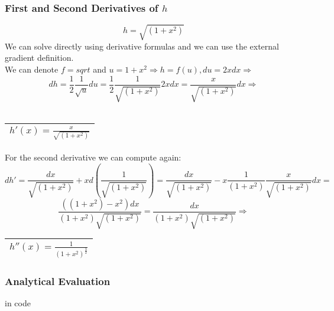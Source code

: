 \documentclass{article}
\newcommand{\rectres}[1]{
\begin{center}
\begin{tabular}{ |c| }
\hline
 #1\\
\hline
\end{tabular}
\end{center}
}
\begin{document}
\subsubsection{First and Second Derivatives of $h$}
$$h=\sqrt{(1+x^2)}$$
We can solve directly using derivative formulas and we can use the external gradient definition.\\
We can denote $f=sqrt$ and $u=1+x^2 \Rightarrow h=f(u), du=2xdx \Rightarrow$
$$dh=\frac{1}{2}\frac{1}{\sqrt{u}}du=\frac{1}{2}\frac{1}{\sqrt{(1+x^2)}}2xdx=\frac{x}{\sqrt{(1+x^2)}}dx\Rightarrow$$\\
\rectres{$h'(x)=\frac{x}{\sqrt{(1+x^2)}}$}
For the second derivative we can compute again:\\
$$dh'=\frac{dx}{\sqrt{(1+x^2)}}+xd(\frac{1}{\sqrt{(1+x^2)}})=\frac{dx}{\sqrt{(1+x^2)}}-x\frac{1}{(1+x^2)}\frac{x}{\sqrt{(1+x^2)}}dx=$$
$$\frac{((1+x^2)-x^2)dx}{(1+x^2)\sqrt{(1+x^2)}}=\frac{dx}{(1+x^2)\sqrt{(1+x^2)}} \Rightarrow$$
\rectres{$h''(x)=\frac{1}{(1+x^2)^{\frac{3}{2}}}$}

\subsubsection{Analytical Evaluation}
in code
\end{document}
